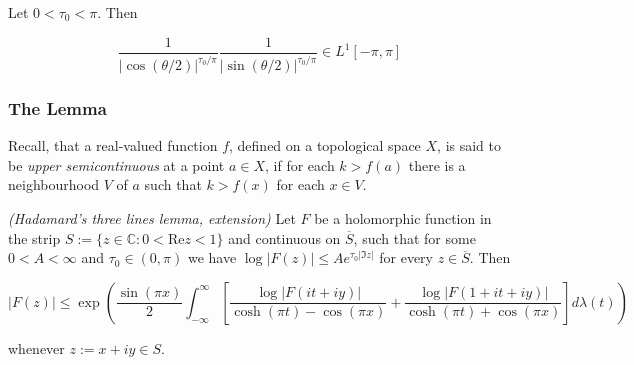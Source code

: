 \begin{lemma}
	Let $0 < \tau_0 < \pi$. Then 

	\begin{equation*}
		\frac{1}{\left| \cos(\theta/2) \right|^{\tau_0/\pi}}\frac{1}{\left| \sin(\theta/2) \right|^{\tau_0/\pi}} \in L^1[-\pi,\pi]
	\end{equation*}
\end{lemma}

\subsubsection{The Lemma}
Recall, that a real-valued function $f$, defined on a topological space $X$, is said to be \emph{upper semicontinuous} at a point $a \in X$, if for each $k > f(a)$ there is a neighbourhood $V$ of $a$ such that $k > f(x)$ for each $x \in V$.

\vspace{2mm}

\begin{mdframed}
	\begin{lemma}\emph{(Hadamard's three lines lemma, extension)}
		Let $F$ be a holomorphic function in the strip $S := \{z \in \mathbb{C}: 0 < \mathrm{Re}z < 1\}$ and continuous on $\overline{S}$, such that for some $0 < A < \infty$ and $\tau_0 \in (0,\pi)$ we have $\log \vert F(z)\vert \leqslant A e^{\tau_0 \vert \Im z \vert}$ for every $z \in \overline{S}$. Then

			\begin{equation*}
				\vert F(z) \vert \leqslant \exp\left( \frac{\sin(\pi x)}{2} \int_{-\infty}^\infty \left[ \frac{\log \vert F(it + iy)\vert}{\cosh(\pi t) - \cos(\pi x)} + \frac{\log \vert F(1 + it + iy)\vert}{\cosh(\pi t) + \cos(\pi x)} \right] d\lambda(t)\right)
			\end{equation*}

			whenever $z := x + iy \in S$.
			\label{lem:EHTL}
	\end{lemma}
\end{mdframed}

